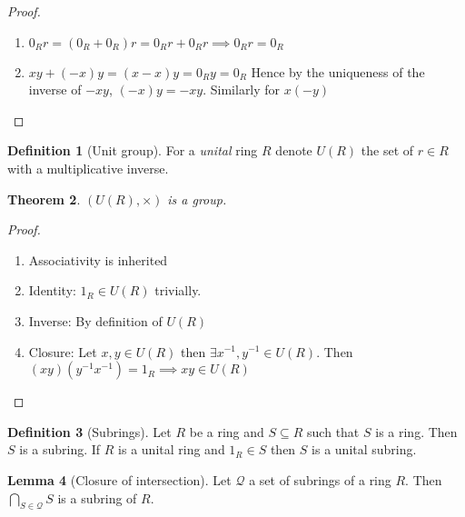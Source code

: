 \documentclass[11pt,a4paper]{article}
\newtheorem{theorem}{Theorem}[section]
\theoremstyle{definition}
\newtheorem{definition}[theorem]{Definition}
\newtheorem{lemma}[theorem]{Lemma}
\begin{document}
\begin{proof}
\begin{enumerate}
	\item $0_R r = (0_R + 0_R) r = 0_R r + 0_R r \implies 0_R r = 0_R$
	\item $xy + (-x)y = (x - x)y = 0_R y = 0_R$ Hence by the uniqueness of the inverse of $-xy$, $(-x)y = -xy$. Similarly for $x(-y)$
\end{enumerate}
\end{proof}

\begin{definition}[Unit group]
For a \emph{unital} ring $R$ denote $U(R)$ the set of $r \in R$ with a multiplicative inverse. 
\end{definition}

\begin{theorem}
$(U(R), \times)$ is a group.  
\end{theorem}

\begin{proof}
\begin{enumerate}
	\item Associativity is inherited
	\item Identity: $1_R \in U(R)$ trivially.
	\item Inverse: By definition of $U(R)$
	\item Closure: Let $x, y \in U(R)$ then $\exists x^{-1}, y^{-1} \in U(R)$. \newline Then $(xy)(y^{-1}x^{-1}) = 1_R \implies xy \in U(R)$
\end{enumerate}
\end{proof}

\begin{definition}[Subrings]
Let $R$ be a ring and $S \subseteq R$ such that $S$ is a ring. Then $S$ is a subring.
If $R$ is a unital ring and $1_R \in S$ then $S$ is a unital subring.
\end{definition}

\begin{lemma}[Closure of intersection]
Let $\mathcal{Q}$ a set of subrings of a ring $R$. Then $\bigcap\limits_{S \in \mathcal{Q}} S$ is a subring of $R$.
\end{lemma}
\end{document}
